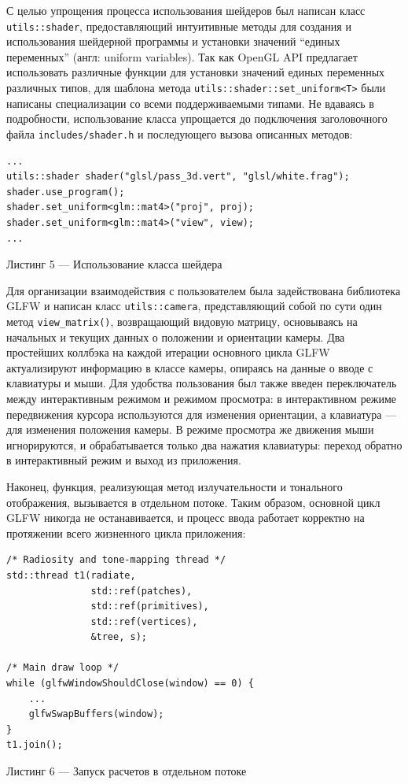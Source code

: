 \documentclass[12pt]{article}
\begin{document}
С целью упрощения процесса использования шейдеров был написан класс \texttt{utils::shader}, предоставляющий интуитивные методы для создания и использования шейдерной программы и установки значений ``единых переменных'' (англ: uniform variables). Так как OpenGL API предлагает использовать различные функции для установки значений единых переменных различных типов, для шаблона метода \texttt{utils::shader::set\_uniform<T>} были написаны специализации со всеми поддерживаемыми типами. Не вдаваясь в подробности, использование класса упрощается до подключения заголовочного файла \texttt{includes/shader.h} и последующего вызова описанных методов:
\begin{lstlisting}
...
utils::shader shader("glsl/pass_3d.vert", "glsl/white.frag");
shader.use_program();
shader.set_uniform<glm::mat4>("proj", proj);
shader.set_uniform<glm::mat4>("view", view);
...
\end{lstlisting}
\begin{center}Листинг 5 --- Использование класса шейдера\end{center}

Для организации взаимодействия с пользователем была задействована библиотека GLFW и написан класс \texttt{utils::camera}, представляющий собой по сути один метод \texttt{view\_matrix()}, возвращающий видовую матрицу, основываясь на начальных и текущих данных о положении и ориентации камеры. Два простейших коллбэка на каждой итерации основного цикла GLFW актуализируют информацию в классе камеры, опираясь на данные о вводе с клавиатуры и мыши. Для удобства пользования был также введен переключатель между интерактивным режимом и режимом просмотра: в интерактивном режиме передвижения курсора используются для изменения ориентации, а клавиатура --- для изменения положения камеры. В режиме просмотра же движения мыши игнорируются, и обрабатывается только два нажатия клавиатуры: переход обратно в интерактивный режим и выход из приложения.

Наконец, функция, реализующая метод излучательности и тонального отображения, вызывается в отдельном потоке. Таким образом, основной цикл GLFW никогда не останавивается, и процесс ввода работает корректно на протяжении всего жизненного цикла приложения:
\begin{lstlisting}
/* Radiosity and tone-mapping thread */
std::thread t1(radiate,
               std::ref(patches),
               std::ref(primitives),
               std::ref(vertices),
               &tree, s);

/* Main draw loop */
while (glfwWindowShouldClose(window) == 0) {
    ...
    glfwSwapBuffers(window);
}
t1.join();
\end{lstlisting}
\begin{center}Листинг 6 --- Запуск расчетов в отдельном потоке\end{center}
\end{document}
